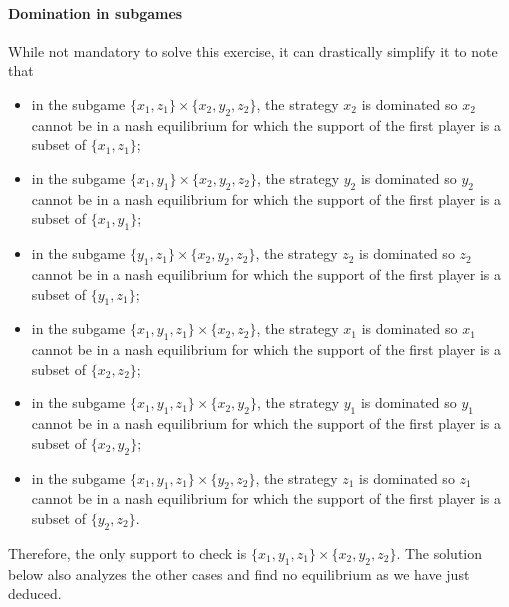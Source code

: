 \paragraph{Domination in subgames}
While not mandatory to solve this exercise, it can drastically simplify it to
note that
\begin{itemize}
  \item in the subgame $\{x_1, z_1\} \times \{x_2, y_2, z_2\}$,
    the strategy $x_2$ is dominated so $x_2$ cannot be in a nash equilibrium
    for which the support of the first player is a subset of $\{x_1, z_1\}$;
  \item in the subgame $\{x_1, y_1\} \times \{x_2, y_2, z_2\}$,
    the strategy $y_2$ is dominated so $y_2$ cannot be in a nash equilibrium
    for which the support of the first player is a subset of $\{x_1, y_1\}$;
  \item in the subgame $\{y_1, z_1\} \times \{x_2, y_2, z_2\}$,
    the strategy $z_2$ is dominated so $z_2$ cannot be in a nash equilibrium
    for which the support of the first player is a subset of $\{y_1, z_1\}$;
  \item in the subgame $\{x_1, y_1, z_1\} \times \{x_2, z_2\}$,
    the strategy $x_1$ is dominated so $x_1$ cannot be in a nash equilibrium
    for which the support of the first player is a subset of $\{x_2, z_2\}$;
  \item in the subgame $\{x_1, y_1, z_1\} \times \{x_2, y_2\}$,
    the strategy $y_1$ is dominated so $y_1$ cannot be in a nash equilibrium
    for which the support of the first player is a subset of $\{x_2, y_2\}$;
  \item in the subgame $\{x_1, y_1, z_1\} \times \{y_2, z_2\}$,
    the strategy $z_1$ is dominated so $z_1$ cannot be in a nash equilibrium
    for which the support of the first player is a subset of $\{y_2, z_2\}$.
\end{itemize}
Therefore, the only support to check is $\{x_1, y_1, z_1\} \times \{x_2, y_2, z_2\}$.
The solution below also analyzes the other cases and find no equilibrium as we
have just deduced.

